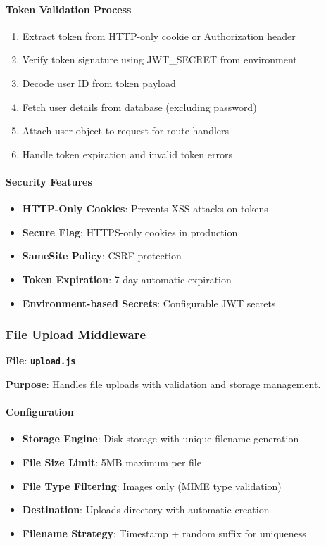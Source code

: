 \documentclass[12pt,a4paper]{article}
\newcommand{\file}[1]{\textbf{\texttt{#1}}}
\begin{document}
\paragraph{Token Validation Process}
\begin{enumerate}
\item Extract token from HTTP-only cookie or Authorization header
\item Verify token signature using JWT\_SECRET from environment
\item Decode user ID from token payload
\item Fetch user details from database (excluding password)
\item Attach user object to request for route handlers
\item Handle token expiration and invalid token errors
\end{enumerate}

\paragraph{Security Features}
\begin{itemize}
\item \textbf{HTTP-Only Cookies}: Prevents XSS attacks on tokens
\item \textbf{Secure Flag}: HTTPS-only cookies in production
\item \textbf{SameSite Policy}: CSRF protection
\item \textbf{Token Expiration}: 7-day automatic expiration
\item \textbf{Environment-based Secrets}: Configurable JWT secrets
\end{itemize}

\subsubsection{File Upload Middleware}
\label{subsubsec:upload-middleware}

\textbf{File}: \file{upload.js}

\textbf{Purpose}: Handles file uploads with validation and storage management.

\paragraph{Configuration}
\begin{itemize}
\item \textbf{Storage Engine}: Disk storage with unique filename generation
\item \textbf{File Size Limit}: 5MB maximum per file
\item \textbf{File Type Filtering}: Images only (MIME type validation)
\item \textbf{Destination}: Uploads directory with automatic creation
\item \textbf{Filename Strategy}: Timestamp + random suffix for uniqueness
\end{itemize}
\end{document}
